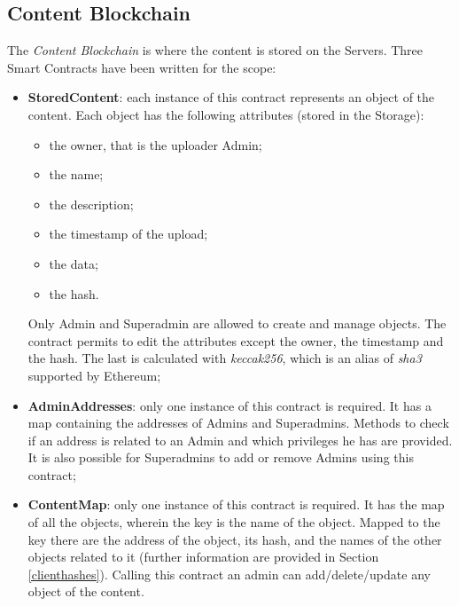 \documentclass[conference,compsoc]{IEEEtran}
\begin{document}
\subsection{Content Blockchain}
The \textit{Content Blockchain} is where the content is stored on the Servers. Three Smart Contracts have been written for the scope:
\begin{itemize}
	\item \textbf{StoredContent}: each instance of this contract represents an object of the content. Each object has the following attributes (stored in the Storage): 
	\begin{itemize}
		\item the owner, that is the uploader Admin;
		\item the name;
		\item the description;
		\item the timestamp of the upload;
		\item the data;
		\item the hash.
	\end{itemize}
	Only Admin and Superadmin are allowed to create and manage objects. The contract permits to edit the attributes except the owner, the timestamp and the hash. The last is calculated with \textit{keccak256}, which is an alias of \textit{sha3} supported by Ethereum;
	\item \textbf{AdminAddresses}: only one instance of this contract is required. It has a map containing the addresses of Admins and Superadmins. Methods to check if an address is related to an Admin and which privileges he has are provided. It is also possible for Superadmins to add or remove Admins using this contract;
	\item \textbf{ContentMap}: only one instance of this contract is required. It has the map of all the objects, wherein the key is the name of the object. Mapped to the key there are the address of the object, its hash, and the names of the other objects related to it (further information are provided in Section \ref{clienthashes}). Calling this contract an admin can add/delete/update any object of the content.
	
\end{itemize}
\end{document}
